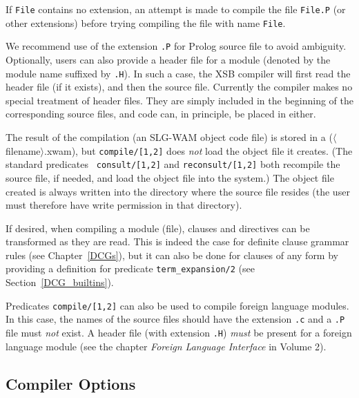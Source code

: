 If {\tt File} contains no extension, an attempt is made to compile the
file {\tt File.P} (or other extensions) before trying compiling the
file with name {\tt File}.

We recommend use of the extension {\tt .P} for Prolog source file to
avoid ambiguity.  Optionally, users can also provide a header file for
a module (denoted by the module name suffixed by {\tt .H}).  In such a
case, the XSB compiler will first read the header file (if it
exists), and then the source file.  Currently the compiler makes no
special treatment of header files.  They are simply included in the
beginning of the corresponding source files, and code can, in
principle, be placed in either.  
 
The result of the compilation (an SLG-WAM object code file) is stored
in a ($\langle$filename$\rangle$.xwam), but {\tt compile/[1,2]} does {\em
not\/} load the object file it creates.  (The standard predicates {\tt
consult/[1,2]} and {\tt reconsult/[1,2]} both recompile the source
file, if needed, and load the object file into the system.)  The
object file created is always written into the directory where the
source file resides (the user must therefore have write permission
in that directory).
 
If desired, when compiling a module (file), clauses and directives can be
transformed as they are read.  This is indeed the case for definite clause
grammar rules (see Chapter~\ref{DCGs}), but it can also be done for clauses
of any form by providing a definition for predicate {\tt term\_expansion/2}
(see Section~\ref{DCG_builtins}).

Predicates {\tt compile/[1,2]} can also be used to compile foreign
language modules.  In this case, the names of the source files should
have the extension {\tt .c} and a {\tt .P} file must {\em not\/}
exist.  A header file (with extension {\tt .H}) {\em must} be present
for a foreign language module (see the chapter {\it Foreign Language
Interface} in Volume 2).


\subsection{Compiler Options}\label{sec:CompilerOptions}

